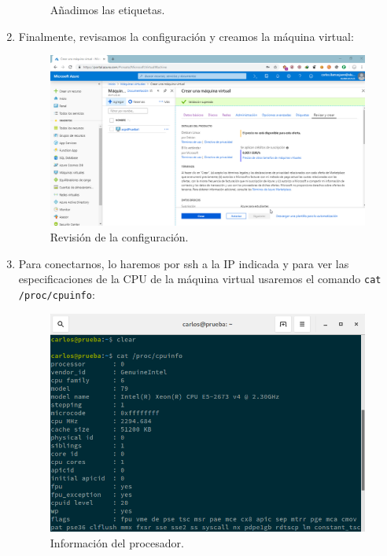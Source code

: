 \begin{enumerate}
\begin{figure}[h]
		\caption{Añadimos las etiquetas.}
		\label{Añadimos las etiqutas2}
	\end{figure}
\newpage
	\item Finalmente, revisamos la configuración y creamos la máquina virtual:
	\begin{figure}[h]
		\centering
		\includegraphics[scale=0.35]{ImagenesAzure/MV/10.png}
		\caption{Revisión de la configuración.}
		\label{Revisión de la configuración}
	\end{figure}
	\item Para conectarnos, lo haremos por ssh a la IP indicada y para ver las especificaciones de la CPU de la máquina virtual usaremos el comando \texttt{cat /proc/cpuinfo}:
	\begin{figure}[h]
		\centering
		\includegraphics[scale=0.45]{ImagenesAzure/MV/cpuinfo.png}
		\caption{Información del procesador.}
		\label{Información del procesador}
	\end{figure}
\end{enumerate}